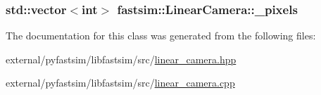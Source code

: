 \subsubsection[{\texorpdfstring{\+\_\+pixels}{_pixels}}]{\setlength{\rightskip}{0pt plus 5cm}std\+::vector$<$int$>$ fastsim\+::\+Linear\+Camera\+::\+\_\+pixels\hspace{0.3cm}{\ttfamily [protected]}}\hypertarget{classfastsim_1_1_linear_camera_aa82ccbc534ad540de0928aefc5d1cf01}{}\label{classfastsim_1_1_linear_camera_aa82ccbc534ad540de0928aefc5d1cf01}


The documentation for this class was generated from the following files\+:\begin{DoxyCompactItemize}
\item 
external/pyfastsim/libfastsim/src/\hyperlink{linear__camera_8hpp}{linear\+\_\+camera.\+hpp}\item 
external/pyfastsim/libfastsim/src/\hyperlink{linear__camera_8cpp}{linear\+\_\+camera.\+cpp}\end{DoxyCompactItemize}

